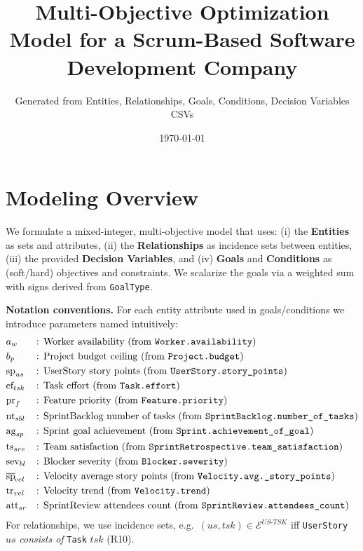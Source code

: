 \documentclass[11pt,a4paper]{article}
\title{Multi-Objective Optimization Model for a Scrum-Based Software Development Company}
\author{Generated from Entities, Relationships, Goals, Conditions, Decision Variables CSVs}
\date{\today}
\begin{document}
\maketitle
\tableofcontents
\newpage

\section*{Modeling Overview}
We formulate a mixed-integer, multi-objective model that uses:
(i) the \textbf{Entities} as sets and attributes,
(ii) the \textbf{Relationships} as incidence sets between entities,
(iii) the provided \textbf{Decision Variables},
and (iv) \textbf{Goals} and \textbf{Conditions} as (soft/hard) objectives and constraints.
We scalarize the goals via a weighted sum with signs derived from \texttt{GoalType}.

\bigskip
\noindent\textbf{Notation conventions.}
For each entity attribute used in goals/conditions we introduce parameters named intuitively:
\[
\begin{aligned}
& a_w &&\text{: Worker availability (from \texttt{Worker.availability})} \\
& b_p &&\text{: Project budget ceiling (from \texttt{Project.budget})} \\
& \text{sp}_{us} &&\text{: UserStory story points (from \texttt{UserStory.story\_points})} \\
& \text{ef}_{tsk} &&\text{: Task effort (from \texttt{Task.effort})} \\
& \text{pr}_f &&\text{: Feature priority (from \texttt{Feature.priority})} \\
& \text{nt}_{sbl} &&\text{: SprintBacklog number of tasks (from \texttt{SprintBacklog.number\_of\_tasks})} \\
& \text{ag}_{sp} &&\text{: Sprint goal achievement (from \texttt{Sprint.achievement\_of\_goal})} \\
& \text{ts}_{sre} &&\text{: Team satisfaction (from \texttt{SprintRetrospective.team\_satisfaction})} \\
& \text{sev}_{bl} &&\text{: Blocker severity (from \texttt{Blocker.severity})} \\
& \overline{\text{sp}}_{\!vel} &&\text{: Velocity average story points (from \texttt{Velocity.avg.\_story\_points})} \\
& \text{tr}_{vel} &&\text{: Velocity trend (from \texttt{Velocity.trend})} \\
& \text{att}_{sr} &&\text{: SprintReview attendees count (from \texttt{SprintReview.attendees\_count})} \\
\end{aligned}
\]
For relationships, we use incidence sets, e.g.\ $(us,tsk)\!\in\!\mathcal{E}^{US\text{-}TSK}$ iff \texttt{UserStory} $us$ \emph{consists of} \texttt{Task} $tsk$ (R10).
\end{document}
